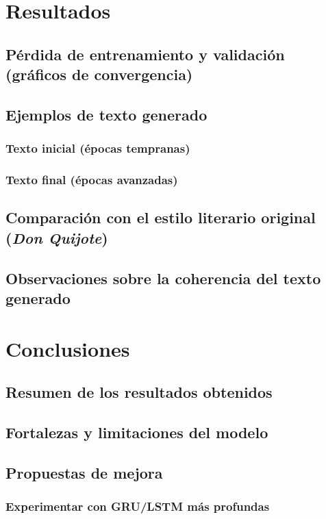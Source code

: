 \documentclass{article}
\begin{document}

\section{Resultados}
\subsection{Pérdida de entrenamiento y validación (gráficos de convergencia)}
\subsection{Ejemplos de texto generado}
\subsubsection{Texto inicial (épocas tempranas)}
\subsubsection{Texto final (épocas avanzadas)}
\subsection{Comparación con el estilo literario original (\textit{Don Quijote})}
\subsection{Observaciones sobre la coherencia del texto generado}

\newpage

\section{Conclusiones}
\subsection{Resumen de los resultados obtenidos}
\subsection{Fortalezas y limitaciones del modelo}
\subsection{Propuestas de mejora}
\subsubsection{Experimentar con GRU/LSTM más profundas}
\end{document}
